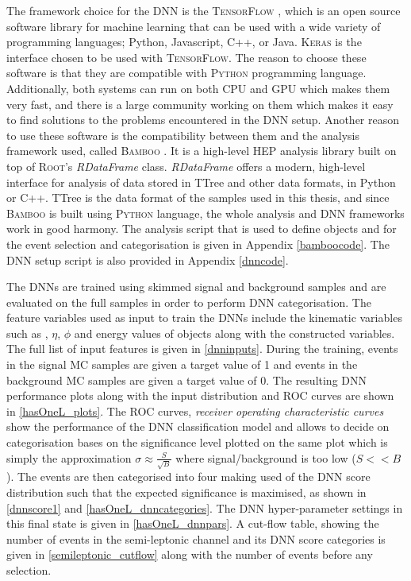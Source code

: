 {The framework choice for the DNN is the \textsc{TensorFlow} \cite{tensorflow}, which is an open source software library for machine learning that can be used with a wide variety of programming languages; Python, Javascript, C++, or Java. \textsc{Keras} \cite{keras} is the interface chosen to be used with \textsc{TensorFlow}. The reason to choose these software is that they are compatible with \textsc{Python} programming language. Additionally, both systems can run on both CPU and GPU which makes them very fast, and there is a large community working on them which makes it easy to find solutions to the problems encountered in the DNN setup. Another reason to use these software is the compatibility between them and the analysis framework used, called \textsc{Bamboo} \cite{bamboo}. It is a high-level HEP analysis library built on top of \textsc{Root}'s \emph{RDataFrame} class. \emph{RDataFrame} offers a modern, high-level interface for analysis of data stored in TTree and other data formats, in Python or C++. TTree is the data format of the samples used in this thesis, and since \textsc{Bamboo} is built using \textsc{Python} language, the whole analysis and DNN frameworks work in good harmony. The analysis script that is used to define objects and for the event selection and categorisation is given in Appendix \autoref{bamboocode}. The DNN setup script is also provided in Appendix \autoref{dnncode}.

The DNNs are trained using skimmed signal and background samples and are evaluated on the full samples in order to perform DNN categorisation. The feature variables used as input to train the DNNs include the kinematic variables such as \pt, $\eta$, $\phi$ and energy values of objects along with the constructed variables. The full list of input features is given in \autoref{dnninputs}. During the training, events in the signal MC samples are given a target value of 1 and events in the background MC samples are given a target value of 0. The resulting DNN performance plots along with the input distribution and ROC curves are shown in \autoref{hasOneL_plots}. The ROC curves, \emph{receiver operating characteristic curves} show the performance of the DNN classification model and allows to decide on categorisation bases on the significance level plotted on the same plot which is simply the approximation $\sigma\approx\frac{S}{\sqrt{B}}$ \cite{soverb} where signal/background is too low ($S<<B$). The events are then categorised into four making used of the DNN score distribution such that the expected significance is maximised, as shown in \autoref{dnnscore1} and \autoref{hasOneL_dnncategories}. The DNN hyper-parameter settings in this final state is given in \autoref{hasOneL_dnnpars}. A cut-flow table, showing the number of events in the semi-leptonic channel and its DNN score categories is given in \autoref{semileptonic_cutflow} along with the number of events before any selection.

}

